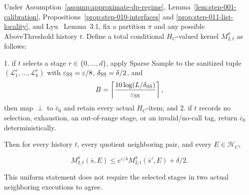 \begin{proposition}\label{prop:step-011-sparse-privacy}
Under Assumption~\ref{assump:approximate-dp-regime},
Lemma~\ref{lem:step-001-calibration},
Propositions~\ref{prop:step-010-interfaces} and
\ref{prop:step-011-list-locality}, and Lyu~\citep{lyu2025}
Lemma~3.1, fix a
partition \(\pi\) and any possible AboveThreshold history \(t\). Define a
total conditional \(H_C\)-valued kernel \(M_{2,t}^{\pi}\) as follows:

1. if \(t\) selects a stage \(r\in\{0,\ldots,d\}\), apply Sparse Sample to
   the sanitized tuple
   \((\mathcal L_1^r,\ldots,\mathcal L_k^r)\) with
   \(\varepsilon_{\rm SS}=\varepsilon/8\),
   \(\delta_{\rm SS}=\delta/2\), and
   \[
   B=\left\lceil
      \frac{10\log(L/\delta_{\rm SS})}{\varepsilon_{\rm SS}}
     \right\rceil,
   \]
   then map
   \(\perp\) to \(\bar c_0\) and retain every actual \(H_C\)-item; and
2. if \(t\) records no selection, exhaustion, an out-of-range stage, or an
   invalid/no-call tag, return \(\bar c_0\) deterministically.

Then for every history \(t\), every quotient neighboring pair, and every
\(E\in\mathcal H_C\),

\[
 M_{2,t}^{\pi}(\bar s,E)
 \leq e^{\varepsilon/4}
       M_{2,t}^{\pi}(\bar s',E)+\delta/2.
\tag{19}
\]

This uniform statement does not require the selected stages in two actual
neighboring executions to agree.


\end{proposition}

